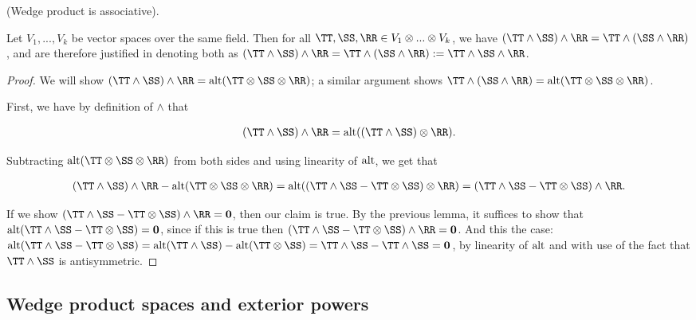 \begin{theorem}
\label{ch::exterior_pwrs::thm::wedge_associativity}
    (Wedge product is associative). 
    
    Let $V_1, ..., V_k$ be vector spaces over the same field. Then for all $\TT, \SS, \RR \in V_1 \otimes ... \otimes V_k$, we have $(\TT \wedge \SS) \wedge \RR = \TT \wedge (\SS \wedge \RR)$, and are therefore justified in denoting both as $(\TT \wedge \SS) \wedge \RR = \TT \wedge (\SS \wedge \RR) := \TT \wedge \SS \wedge \RR$.
\end{theorem}

\begin{proof}
    We will show $(\TT \wedge \SS) \wedge \RR = \alt(\TT \otimes \SS \otimes \RR)$; a similar argument shows $\TT \wedge (\SS \wedge \RR) = \alt(\TT \otimes \SS \otimes \RR)$.
    
    First, we have by definition of $\wedge$ that 
    
    \begin{align*}
        (\TT \wedge \SS) \wedge \RR = \alt((\TT \wedge \SS) \otimes \RR).
    \end{align*}
    
    Subtracting $\alt(\TT \otimes \SS \otimes \RR)$ from both sides and using linearity of $\text{alt}$, we get that
    
    \begin{align*}
        (\TT \wedge \SS) \wedge \RR - \alt(\TT \otimes \SS \otimes \RR) = \alt((\TT \wedge \SS - \TT \otimes \SS) \otimes \RR) = (\TT \wedge \SS - \TT \otimes \SS) \wedge \RR.
    \end{align*}
    
    If we show $(\TT \wedge \SS - \TT \otimes \SS) \wedge \RR = \mathbf{0}$, then our claim is true. By the previous lemma, it suffices to show that $\alt(\TT \wedge \SS - \TT \otimes \SS) = \mathbf{0}$, since if this is true then $(\TT \wedge \SS - \TT \otimes \SS) \wedge \RR = \mathbf{0}$. And this the case: $\alt(\TT \wedge \SS - \TT \otimes \SS) = \alt(\TT \wedge \SS) - \alt(\TT \otimes \SS) = \TT \wedge \SS - \TT \wedge \SS = \mathbf{0}$, by linearity of $\text{alt}$ and with use of the fact that $\TT \wedge \SS$ is antisymmetric.
\end{proof}

\subsection*{Wedge product spaces and exterior powers}

